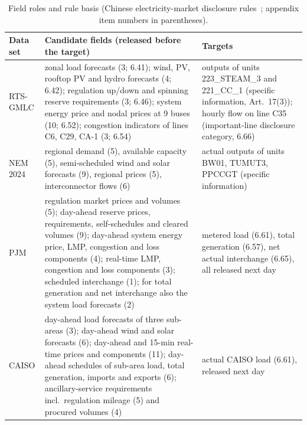 \begin{table}[!tp]
\centering\footnotesize
\caption{Field roles and rule basis (Chinese electricity-market disclosure rules~\cite{nea2024disclosure}; appendix item numbers in parentheses).}\label{tab:fields}
\setlength{\tabcolsep}{3pt}
\begin{tabular}{l>{\raggedright\arraybackslash}p{9.0cm}>{\raggedright\arraybackslash}p{5.3cm}}
\toprule
Data set & Candidate fields (released before the target) & Targets \\
\midrule
RTS-GMLC & zonal load forecasts (3; 6.41); wind, PV, rooftop PV and hydro forecasts (4; 6.42); regulation up/down and spinning reserve requirements (3; 6.46); system energy price and nodal prices at 9 buses (10; 6.52); congestion indicators of lines C6, C29, CA-1 (3; 6.54) & outputs of units 223\_STEAM\_3 and 221\_CC\_1 (specific information, Art.~17(3)); hourly flow on line C35 (important-line disclosure category, 6.66)\\
NEM 2024 & regional demand (5), available capacity (5), semi-scheduled wind and solar forecasts (9), regional prices (5), interconnector flows (6) & actual outputs of units BW01, TUMUT3, PPCCGT (specific information)\\
PJM & regulation market prices and volumes (5); day-ahead reserve prices, requirements, self-schedules and cleared volumes (9); day-ahead system energy price, LMP, congestion and loss components (4); real-time LMP, congestion and loss components (3); scheduled interchange (1); for total generation and net interchange also the system load forecasts (2) & metered load (6.61), total generation (6.57), net actual interchange (6.65), all released next day\\
CAISO & day-ahead load forecasts of three sub-areas (3); day-ahead wind and solar forecasts (6); day-ahead and 15-min real-time prices and components (11); day-ahead schedules of sub-area load, total generation, imports and exports (6); ancillary-service requirements incl.\ regulation mileage (5) and procured volumes (4) & actual CAISO load (6.61), released next day\\
\bottomrule
\end{tabular}
\end{table}
